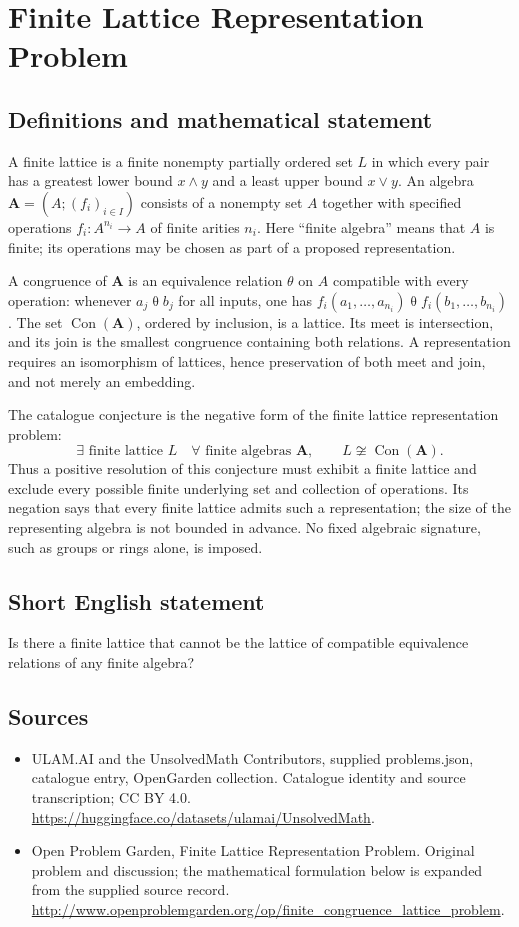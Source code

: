 \documentclass[11pt,a4paper]{article}
\begin{document}
\section*{Finite Lattice Representation Problem}\label{statement}

\subsection{Definitions and mathematical statement}
A finite lattice is a finite nonempty partially ordered set $L$ in which every
pair has a greatest lower bound $x\wedge y$ and a least upper bound $x\vee y$.
An algebra $\mathbf A=(A;(f_i)_{i\in I})$ consists of a nonempty set $A$ together
with specified operations $f_i:A^{n_i}\to A$ of finite arities $n_i$.
Here ``finite algebra'' means that $A$ is finite; its operations may be chosen
as part of a proposed representation.

A congruence of $\mathbf A$ is an equivalence relation $\theta$ on $A$ compatible
with every operation: whenever $a_j\mathrel\theta b_j$ for all inputs, one has
$f_i(a_1,\ldots,a_{n_i})\mathrel\theta f_i(b_1,\ldots,b_{n_i})$.
The set $\operatorname{Con}(\mathbf A)$, ordered by inclusion, is a lattice.
Its meet is intersection, and its join is the smallest congruence containing
both relations. A representation requires an isomorphism of lattices, hence
preservation of both meet and join, and not merely an embedding.

The catalogue conjecture is the negative form of the finite lattice
representation problem:
\[
 \exists\text{ finite lattice }L\quad
 \forall\text{ finite algebras }\mathbf A,\qquad
 L\not\cong\operatorname{Con}(\mathbf A).
\]
Thus a positive resolution of this conjecture must exhibit a finite lattice
and exclude every possible finite underlying set and collection of operations.
Its negation says that every finite lattice admits such a representation;
the size of the representing algebra is not bounded in advance. No fixed
algebraic signature, such as groups or rings alone, is imposed.
\subsection{Short English statement}
Is there a finite lattice that cannot be the lattice of compatible equivalence relations of any finite algebra?
\subsection{Sources}
\begin{itemize}
\item[S1] ULAM.AI and the UnsolvedMath Contributors, supplied problems.json, catalogue entry, OpenGarden collection. Catalogue identity and source transcription; CC BY 4.0.
\url{https://huggingface.co/datasets/ulamai/UnsolvedMath}.
\item[S2] Open Problem Garden, Finite Lattice Representation Problem. Original problem and discussion; the mathematical formulation below is expanded from the supplied source record.
\url{http://www.openproblemgarden.org/op/finite_congruence_lattice_problem}.
\end{itemize}
\end{document}
